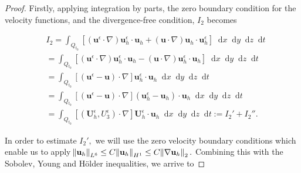 \documentclass[11pt, a4paper]{article}
\newcommand*\diff{\mathop{}\!\mathrm{d}}
\begin{document}
\begin{proof}
Firstly, applying integration by parts, the zero boundary condition for the velocity functions, and the divergence-free condition, $I_2$ becomes

\begin{equation}
\begin{split}
& I_2 = \int_{Q_{t_0}} [(\mathbf{u}^\epsilon \cdot \nabla) \mathbf{u}_h^\epsilon \cdot \mathbf{u}_h + (\mathbf{u} \cdot \nabla )\mathbf{u}_h \cdot \mathbf{u}_h^\epsilon] \diff x \diff y \diff z \diff t \\
& = \int_{Q_{t_0}} [(\mathbf{u}^\epsilon \cdot \nabla) \mathbf{u}_h^\epsilon \cdot \mathbf{u}_h - (\mathbf{u} \cdot \nabla )\mathbf{u}^\epsilon_h \cdot \mathbf{u}_h] \diff x \diff y \diff z \diff t \\
& = \int_{Q_{t_0}} [(\mathbf{u}^\epsilon - \mathbf{u}) \cdot \nabla ] \mathbf{u}_h^\epsilon \cdot \mathbf{u}_h \diff x \diff y \diff z \diff t \\
& = \int_{Q_{t_0}} [(\mathbf{u}^\epsilon - \mathbf{u}) \cdot \nabla ] (\mathbf{u}_h^\epsilon - \mathbf{u}_h) \cdot \mathbf{u}_h \diff x \diff y \diff z \diff t \\
& = \int_{Q_{t_0}} [(\mathbf{U}_h^\epsilon, U^\epsilon_3) \cdot \nabla ] \mathbf{U}_h^\epsilon \cdot \mathbf{u}_h \diff x \diff y \diff z \diff t := I_2' + I_2''.
\end{split}
\end{equation}

In order to estimate $I_2',$ we will use the zero velocity boundary conditions which enable us to apply $\norm{\mathbf{u}_h}_{L^6} \leq C \norm{\mathbf{u}_h}_{H^1} \leq C \norm{\nabla \mathbf{u}_h}_2.$ Combining this with the Sobolev, Young and H\"older inequalities, we arrive to


\end{proof}
\end{document}
